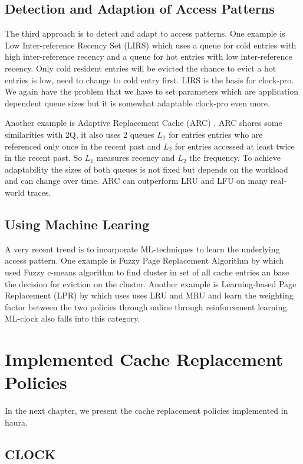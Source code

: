 \documentclass[
	12pt,
	a4paper,
	abstract,
	bibliography=totoc,
	chapterprefix,
	headings=openright,
	numbers=endperiod,
	parskip=half,
	twoside,
]{scrreprt}
\begin{document}
\subsection{Detection and Adaption of Access Patterns}
The third approach is to detect and adapt to access patterns.
One example is Low Inter-reference Recency Set (LIRS) \cite{10.1145/511399.511340} which uses a queue for cold entries with high inter-reference recency and a queue for hot entries with low inter-reference recency.
Only cold resident entries will be evicted the chance to evict a hot entries is low, need to change to cold entry first.
LIRS is the basis for clock-pro.
We again have the problem that we have to set parameters which are application dependent queue sizes but it is somewhat adaptable clock-pro even more.

Another example is Adaptive Replacement Cache (ARC) \cite{270366}.
ARC shares some similarities with 2Q, it also uses 2 queues $L_1$ for entries entries who are referenced only once in the recent past and $L_2$ for entries accessed at least twice in the recent past.
So  $L_1$ measures recency and $L_2$ the frequency.
To achieve adaptability the sizes of both queues is not fixed but depends on the workload and can change over time.
ARC can outperform LRU and LFU on many real-world traces.

\subsection{Using Machine Learing}
A very recent trend is to incorporate ML-techniques to learn the underlying access pattern.
One example is Fuzzy Page Replacement Algorithm by \cite{akbari2020page}
which used Fuzzy c-means algorithm to find cluster in set of all cache entries an base the decision for eviction on the cluster.
Another example is Learning-based Page Replacement (LPR) by \cite{kim2022lpr} which uses 
uses LRU and MRU and learn the weighting factor between the two policies through online through reinforcement learning.
ML-clock also falls into this category.

\section{Implemented Cache Replacement Policies}

In the next chapter, we present the cache replacement policies implemented in haura.

\subsection{CLOCK}
\end{document}
